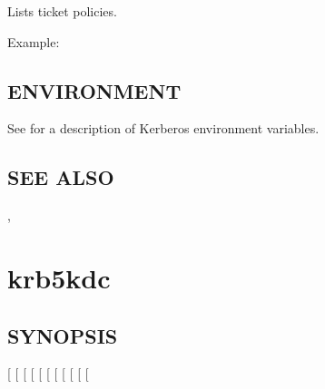 \documentclass[letterpaper,10pt,english]{sphinxmanual}
\begin{document}
Lists ticket policies.

Example:

%
\begin{sphinxVerbatim}[commandchars=\\\{\}]
    
      
  
\end{sphinxVerbatim}


\subsection{ENVIRONMENT}
\label{\detokenize{admin/admin_commands/kdb5_ldap_util:environment}}\label{\detokenize{admin/admin_commands/kdb5_ldap_util:kdb5-ldap-util-list-policy-end}}
See  for a description of Kerberos environment
variables.


\subsection{SEE ALSO}
\label{\detokenize{admin/admin_commands/kdb5_ldap_util:see-also}}
{\hyperref[\detokenize{admin/admin_commands/kadmin_local:kadmin-1}]{}}, 


\section{krb5kdc}
\label{\detokenize{admin/admin_commands/krb5kdc::doc}}\label{\detokenize{admin/admin_commands/krb5kdc:krb5kdc-8}}\label{\detokenize{admin/admin_commands/krb5kdc:krb5kdc}}

\subsection{SYNOPSIS}
\label{\detokenize{admin/admin_commands/krb5kdc:synopsis}}
{[} \sphinxstyleemphasis{db\_args}{]}
{[} \sphinxstyleemphasis{dbname}{]}
{[} \sphinxstyleemphasis{keytype}{]}
{[} \sphinxstyleemphasis{mkeyname}{]}
{[} \sphinxstyleemphasis{portnum}{]}
{[}\sphinxstylestrong{-m}{]}
{[} \sphinxstyleemphasis{realm}{]}
{[}\sphinxstylestrong{-n}{]}
{[} \sphinxstyleemphasis{numworkers}{]}
{[} \sphinxstyleemphasis{pid\_file}{]}
{[} \sphinxstyleemphasis{time\_offset}{]}
\end{document}
